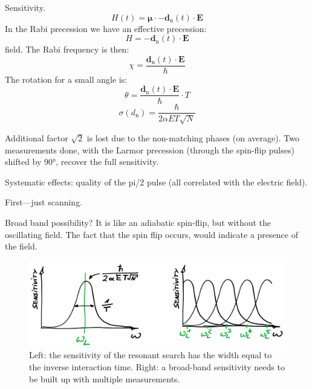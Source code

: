 Sensitivity. 
\begin{equation}
  H(t) = \bm{\mu} \cdot \bm - \bm{d}_\text{n}(t) \cdot \bm{E}
\end{equation}
In the Rabi precession we have an effective precession:
\begin{equation}
  H = - \bm{d}_\text{n}(t) \cdot \bm{E}
\end{equation}
field. The Rabi frequency is then:
\begin{equation}
  \chi = \frac{ \bm{d}_\text{n}(t) \cdot \bm{E} }{ \hbar }
\end{equation}
The rotation for a small angle is:
\begin{equation}
  \theta = \frac{ \bm{d}_\text{n}(t) \cdot \bm{E} }{ \hbar } \cdot T
\end{equation}
\begin{equation}
  \sigma(d_\text{n}) = \frac{ \hbar }{ 2 \alpha E T \sqrt{N} }
\end{equation}

Additional factor $\sqrt{2}$ is lost due to the non-matching phases (on average). Two measurements done, with the Larmor precession (through the spin-flip pulses) shifted by \ang{90}, recover the full sensitivity.


Systematic effects: quality of the pi/2 pulse (all correlated with the electric field).

First---just scanning.

Broad band possibility? It is like an adiabatic spin-flip, but without the oscillating field. The fact that the spin flip occurs, would indicate a presence of the field.

\begin{figure}
  \centering
  \includegraphics[width=0.8\linewidth]{gfx/axions/resonant_sensitivity.png}
  \caption{Left: the sensitivity of the resonant search has the width equal to the inverse interaction time. Right: a broad-band sensitivity needs to be built up with multiple measurements.}\label{fig:axions_resonant_sensitivity}
\end{figure}


